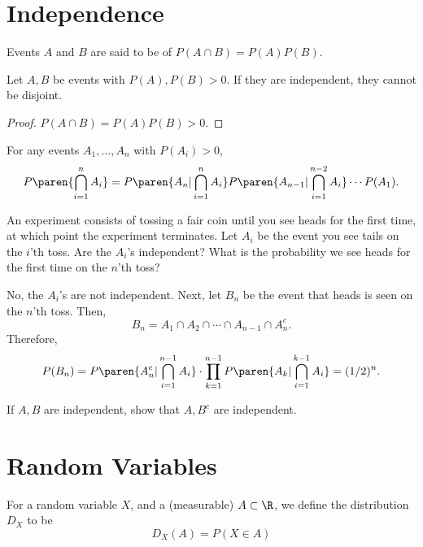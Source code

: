 \documentclass[11pt]{article}
\begin{document}
\section{Independence}

\begin{defn}
    Events $A$ and $B$ are said to be  of $P(A\cap B)=P(A)P(B)$.
\end{defn}

\begin{thm}
    Let $A,B$ be events with $P(A),P(B)>0$. If they are independent, they cannot be disjoint.
\end{thm}

\begin{proof}
    $P(A\cap B)=P(A)P(B)>0$.
\end{proof}

\begin{thm}
    For any events $A_1,\dots,A_n$ with $P(A_i)>0$,
    $$P\paren{\bigcap_{i=1}^nA_i}=P\paren{A_n |\bigcap_{i=1}^nA_i}P\paren{A_{n-1}|\bigcap_{i=1}^{n-2}A_i}\cdots P(A_1).$$
\end{thm}

\begin{ex}
    An experiment consists of tossing a fair coin until you see heads for the first time, at which point the experiment terminates. Let $A_i$ be the event you see tails on the $i$'th toss. Are the $A_i$'s independent? What is the probability we see heads for the first time on the $n$'th toss?

    No, the $A_i$'s are not independent. Next, let $B_n$ be the event that heads is seen on the $n$'th toss. Then,
    $$B_n = A_1 \cap A_2 \cap \cdots \cap A_{n-1}\cap A_n^c.$$
    Therefore,
    $$P(B_n) = P\paren{A_n^c |\bigcap_{i=1}^{n-1}A_i} \cdot \prod_{k=1}^{n-1}P\paren{A_k|\bigcap_{i=1}^{k-1}A_i}=(1/2)^n.$$
\end{ex}

\begin{exercise}
    If $A,B$ are independent, show that $A,B^c$ are independent.
\end{exercise}

\section{Random Variables}

\begin{defn}
    For a random variable $X$, and a (measurable) $A \subset \R$, we define the distribution $D_X$ to be
    $$D_X(A) = P(X\in A)$$
\end{defn}
\end{document}
